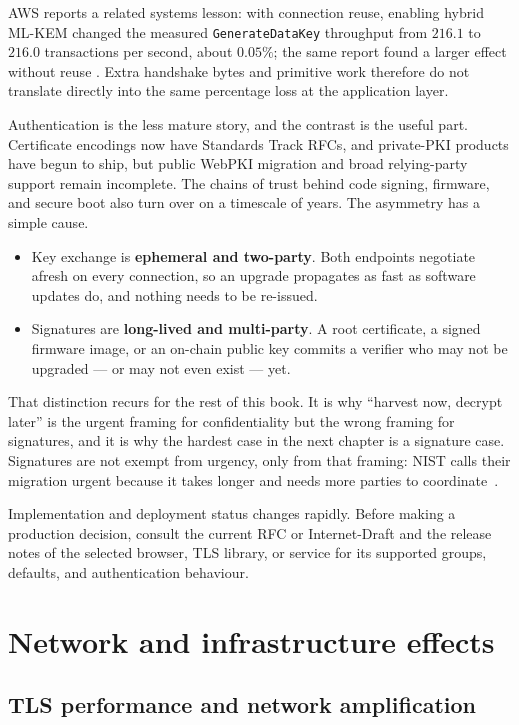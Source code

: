 AWS reports a related systems
lesson: with connection reuse, enabling hybrid ML-KEM changed the measured
\texttt{GenerateDataKey} throughput from $216.1$ to $216.0$ transactions per
second, about $0.05\%$; the same report found a larger effect without reuse
\cite{awspqtls2025}. Extra handshake bytes and primitive work therefore do not
translate directly into the same percentage loss at the application layer.

Authentication is the less mature story, and the contrast is the useful part.
Certificate encodings now have Standards Track RFCs, and private-PKI products
have begun to ship, but public WebPKI migration and broad relying-party support
remain incomplete. The chains of trust behind code signing, firmware, and secure
boot also turn over on a timescale of years. The asymmetry has a simple cause.

\begin{itemize}
  \item Key exchange is \textbf{ephemeral and two-party}. Both endpoints
        negotiate afresh on every connection, so an upgrade propagates as fast as
        software updates do, and nothing needs to be re-issued.
  \item Signatures are \textbf{long-lived and multi-party}. A root certificate,
        a signed firmware image, or an on-chain public key commits a verifier who
        may not be upgraded --- or may not even exist --- yet.
\end{itemize}

That distinction recurs for the rest of this book. It is why ``harvest now,
decrypt later'' is the urgent framing for confidentiality but the wrong framing
for signatures, and it is why the hardest case in the next chapter is a
signature case. Signatures are not exempt from urgency, only from that framing:
NIST calls their migration urgent because it takes longer and needs more parties
to coordinate~\cite{nistir8547}.

Implementation and deployment status changes rapidly. Before making a production
decision, consult the current RFC or Internet-Draft and the release notes of the
selected browser, TLS library, or service for its supported groups, defaults, and
authentication behaviour.

\section{Network and infrastructure effects}

\subsection{TLS performance and network amplification}

